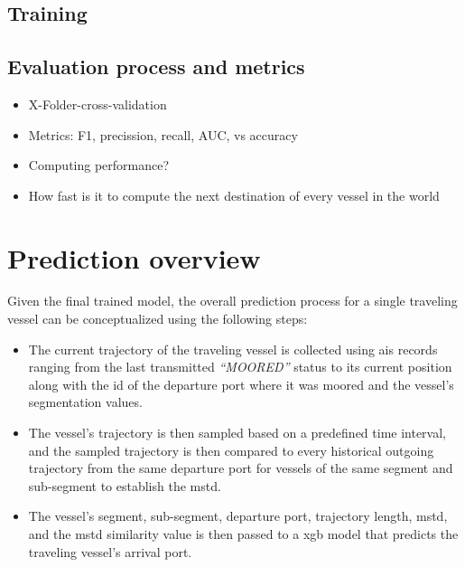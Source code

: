 \subsection{Training}

\subsection{Evaluation process and metrics}

\begin{itemize}
    \item X-Folder-cross-validation
    \item Metrics: F1, precission, recall, AUC, vs accuracy
    \item Computing performance?
    \item How fast is it to compute the next destination of every vessel in the world
\end{itemize}

\section{Prediction overview}

Given the final trained model, the overall prediction process for a single traveling vessel can be conceptualized using the following steps:

\begin{itemize}
    \item The current trajectory of the traveling vessel is collected using \acrshort{ais} records ranging from the last transmitted \textit{``MOORED''} status to its current position along with the id of the departure port where it was moored and the vessel's segmentation values.
    \item The vessel's trajectory is then sampled based on a predefined time interval, and the sampled trajectory is then compared to every historical outgoing trajectory from the same departure port for vessels of the same segment and sub-segment to establish the \acrfull{mstd}.
    \item The vessel's segment, sub-segment, departure port, trajectory length, \acrshort{mstd}, and the \acrshort{mstd} similarity value is then passed to a \acrshort{xgb} model that predicts the traveling vessel's arrival port.
\end{itemize}

